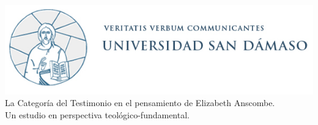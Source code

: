 \begin{titlepage}

  \begin{center}
      \includegraphics[width=8.71 cm]{./img/sandamaso}
      \huge La Categoría del Testimonio en el pensamiento de Elizabeth Anscombe.\\
      \large Un estudio en perspectiva teológico-fundamental.
  \end{center}
\end{titlepage}
